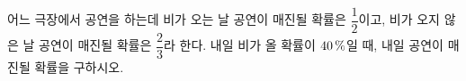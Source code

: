 어느 극장에서 공연을 하는데 비가 오는 날 공연이 매진될 확률은 $\dfrac{1}{2}$이고, 비가 오지 않은 날 공연이 매진될 확률은 $\dfrac{2}{3}$라 한다. 내일 비가 올 확률이 $40\mkern3mu \%$일 때, 내일 공연이 매진될 확률을 구하시오.
